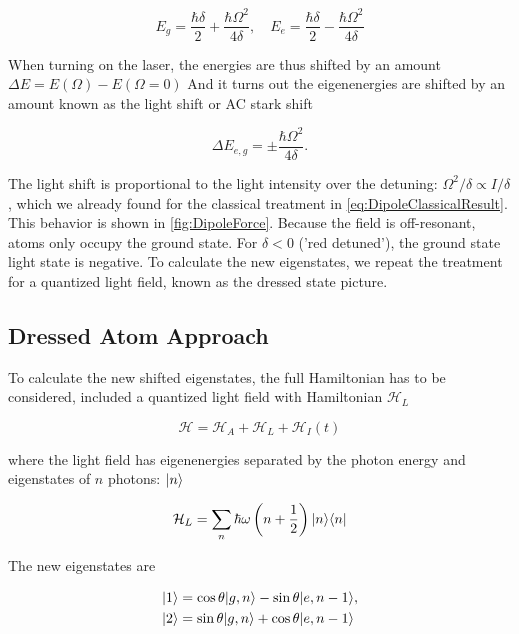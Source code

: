 \begin{equation}
	E_g = \frac{\hbar \delta}{2} +\frac{\hbar \Omega^2}{4 \delta}, \quad
	E_e = \frac{\hbar \delta}{2} -\frac{\hbar \Omega^2}{4 \delta}
\end{equation}

When turning on the laser, the energies are thus shifted by an amount $\Delta E = E(\Omega)-E(\Omega=0)$ And it turns out the eigenenergies are shifted by an amount known as the light shift or AC stark shift \cite{Vredenbregt2020}

\begin{equation}\label{eq:Stark}
	\Delta E_{e,g} = \pm \frac{\hbar \Omega^2}{4 \delta}.
\end{equation}

The light shift is proportional to the light intensity over the detuning: $\Omega^2 / \delta \propto I / \delta$, which we already found for the classical treatment in \cref{eq:DipoleClassicalResult}. This behavior is shown in \cref{fig:DipoleForce}. Because the field is off-resonant, atoms only occupy the ground state. For $\delta <0$ ('red detuned'), the ground state light state is negative. To calculate the new eigenstates, we repeat the treatment for a quantized light field, known as the dressed state picture.

\subsection{Dressed Atom Approach}

To calculate the new shifted eigenstates, the full Hamiltonian has to be considered, included a quantized light field with Hamiltonian $\mathcal{H}_L$ \cite{Dalibard1985}

\begin{equation}
	\mathcal{H} = \mathcal{H}_A + \mathcal{H}_L + \mathcal{H}_I(t)
\end{equation}

where the light field has eigenenergies separated by the photon energy and eigenstates of $n$ photons: $\lvert n\rangle$ \cite{Vredenbregt2020}

\begin{equation}
	\mathcal{H}_L = \sum_n \hbar \omega \left(n+\frac{1}{2}\right) \lvert n\rangle\langle n\rvert
\end{equation}

The new eigenstates are 

\begin{equation}
	\begin{split}
		\lvert1\rangle &= \cos{\theta} \lvert g,n\rangle - \sin{\theta} \lvert e,n-1\rangle,\\
		\lvert2\rangle &= \sin{\theta} \lvert g,n\rangle + \cos{\theta} \lvert e,n-1\rangle
	\end{split}
\end{equation}

